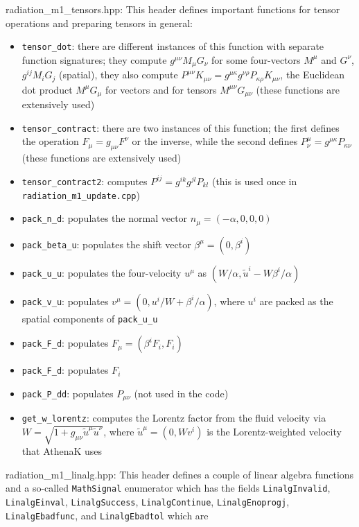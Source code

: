 \documentclass{article}
\newcommand{\var}[1]{%
  {\setlength{\fboxsep}{1.5pt}%
   \colorbox{varbg}{\textcolor{varfg}{\texttt{\small #1}}}}}
\begin{document}
{\color{gray}radiation\_m1\_tensors.hpp:} This header defines important functions for tensor operations and preparing tensors in general:
\begin{itemize}
  \item \var{tensor\_dot}: there are different instances of this function with separate function signatures; they compute $g^{\mu\nu}M_{\mu}G_{\nu}$ for some four-vectors $M^{\mu}$
  and $G^{\nu}$, $g^{ij}M_iG_j$ (spatial), they also compute $P^{\mu\nu}K_{\mu\nu}=g^{\mu\kappa}g^{\nu\rho}P_{\kappa\rho}K_{\mu\nu}$, the Euclidean dot product $M^{\mu}G_{\mu}$ for vectors and for tensors
  $M^{\mu\nu}G_{\mu\nu}$ (these functions are extensively used)
  \item \var{tensor\_contract}: there are two instances of this function; the first defines the operation $F_{\mu}=g_{\mu\nu}F^{\nu}$ or the inverse, while
  the second defines $P^{\mu}_{\nu}=g^{\mu\kappa}P_{\kappa\nu}$ (these functions are extensively used)
  \item \var{tensor\_contract2}: computes $P^{ij}=g^{ik}g^{jl}P_{kl}$ (this is used once in \var{radiation\_m1\_update.cpp})
  \item \var{pack\_n\_d}: populates the normal vector $n_{\mu}=(-\alpha,0,0,0)$
  \item \var{pack\_beta\_u}: populates the shift vector $\beta^{\mu}=(0,\beta^i)$
  \item \var{pack\_u\_u}: populates the four-velocity $u^{\mu}$ as $(W/\alpha,\tilde{u}^i-W\beta^i/\alpha)$
  \item \var{pack\_v\_u}: populates $v^{\mu}=(0,u^i/W+\beta^i/\alpha)$, where $u^i$ are packed as the spatial components
  of \var{pack\_u\_u}
  \item \var{pack\_F\_d}: populates $F_{\mu}=(\beta^iF_i,F_i)$
  \item \var{pack\_F\_d}: populates $F_i$
  \item \var{pack\_P\_dd}:  populates $P_{\mu\nu}$ (not used in the code)
  \item \var{get\_w\_lorentz}: computes the Lorentz factor from the fluid velocity via $W=\sqrt{1+g_{\mu\nu}\tilde{u}^{\mu}\tilde{u}^{\nu}}$, where
  $\tilde{u}^{\mu}=(0,Wv^i)$ is the Lorentz-weighted velocity that AthenaK uses
\end{itemize}
{\color{gray}radiation\_m1\_linalg.hpp:} This header defines a couple of linear algebra functions and a so-called \var{MathSignal} enumerator which has the fields
\var{LinalgInvalid}, \var{LinalgEinval}, \var{LinalgSuccess}, \var{LinalgContinue}, \var{LinalgEnoprogj}, \var{LinalgEbadfunc}, and \var{LinalgEbadtol} which are
\end{document}
